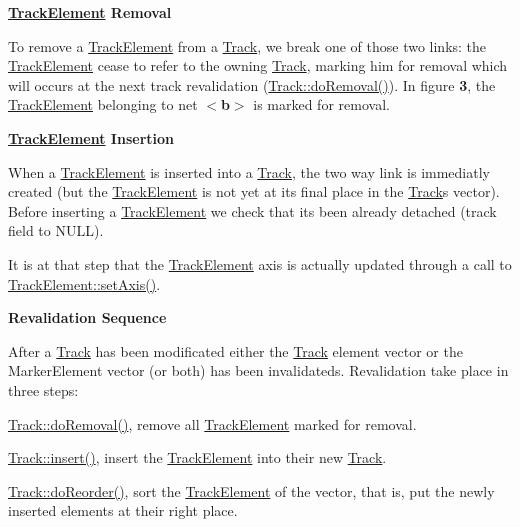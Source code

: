 {\bfseries \hyperlink{classKite_1_1TrackElement}{Track\+Element} Removal}

To remove a \hyperlink{classKite_1_1TrackElement}{Track\+Element} from a \hyperlink{classKite_1_1Track}{Track}, we break one of those two links\+: the \hyperlink{classKite_1_1TrackElement}{Track\+Element} cease to refer to the owning \hyperlink{classKite_1_1Track}{Track}, marking him for removal which will occurs at the next track revalidation (\hyperlink{classKite_1_1Track_abfffcd781865b94f62f27a1e7be99a38}{Track\+::do\+Removal()}). In figure {\bfseries 3}, the \hyperlink{classKite_1_1TrackElement}{Track\+Element} belonging to net {\bfseries $<$b$>$} is marked for removal.

 {\bfseries \hyperlink{classKite_1_1TrackElement}{Track\+Element} Insertion}

When a \hyperlink{classKite_1_1TrackElement}{Track\+Element} is inserted into a \hyperlink{classKite_1_1Track}{Track}, the two way link is immediatly created (but the \hyperlink{classKite_1_1TrackElement}{Track\+Element} is not yet at it\textquotesingle{}s final place in the \hyperlink{classKite_1_1Track}{Track}\textquotesingle{}s vector). Before inserting a \hyperlink{classKite_1_1TrackElement}{Track\+Element} we check that it\textquotesingle{}s been already detached ({\ttfamily track} field to {\ttfamily N\+U\+LL}).

It is at that step that the \hyperlink{classKite_1_1TrackElement}{Track\+Element} axis is actually updated through a call to \hyperlink{classKite_1_1TrackElement_a45e685b1e3ee630d24bf43746553af4c}{Track\+Element\+::set\+Axis()}.

{\bfseries Revalidation Sequence}

After a \hyperlink{classKite_1_1Track}{Track} has been modificated either the \hyperlink{classKite_1_1Track}{Track} element vector or the Marker\+Element vector (or both) has been invalidateds. Revalidation take place in three steps\+:
\begin{DoxyItemize}
\item \hyperlink{classKite_1_1Track_abfffcd781865b94f62f27a1e7be99a38}{Track\+::do\+Removal()}, remove all \hyperlink{classKite_1_1TrackElement}{Track\+Element} marked for removal.
\item \hyperlink{classKite_1_1Track_aa392ba7cf1e3e485aac11cf326e31918}{Track\+::insert()}, insert the \hyperlink{classKite_1_1TrackElement}{Track\+Element} into their new \hyperlink{classKite_1_1Track}{Track}.
\item \hyperlink{classKite_1_1Track_aaccb9224f5b38ecd8506fd1eec9ef5ca}{Track\+::do\+Reorder()}, sort the \hyperlink{classKite_1_1TrackElement}{Track\+Element} of the vector, that is, put the newly inserted elements at their right place.
\end{DoxyItemize}

